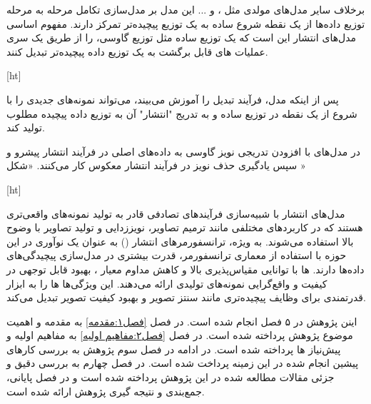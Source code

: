برخلاف سایر مدل‌های مولدی مثل ،  و ... این مدل‌ بر مدل‌سازی تکامل مرحله به مرحله توزیع داده‌ها از یک نقطه شروع ساده به یک توزیع پیچیده‌تر تمرکز دارند. مفهوم اساسی مدل‌های انتشار این است که یک توزیع ساده مثل توزیع گاوسی، را از طریق یک سری عملیات های قابل برگشت به یک توزیع داده پیچیده‌تر تبدیل کنند.

[ht]

پس از اینکه مدل، فرآیند تبدیل را آموزش می‌بیند، می‌تواند نمونه‌های جدیدی را با شروع از یک نقطه در توزیع ساده و به تدریج "انتشار" آن به توزیع داده پیچیده مطلوب تولید کند.

در مدل‌های 
با افزودن تدریجی نویز گاوسی به داده‌های اصلی در فرآیند انتشار پیشرو و سپس یادگیری حذف نویز در فرآیند انتشار معکوس کار می‌کنند. «شکل »


[ht]




مدل‌های انتشار با شبیه‌سازی فرآیندهای تصادفی قادر به تولید نمونه‌های واقعی‌تری هستند که در کاربردهای مختلفی مانند ترمیم تصاویر، نویززدایی و تولید تصاویر با وضوح بالا استفاده می‌شوند. به ویژه، ترانسفورمرهای انتشار () به عنوان یک نوآوری در این حوزه با استفاده از معماری ترانسفورمر، قدرت بیشتری در مدل‌سازی پیچیدگی‌های داده‌ها دارند. ها با توانایی مقیاس‌پذیری بالا و کاهش مداوم معیار ، بهبود قابل توجهی در کیفیت و واقع‌گرایی نمونه‌های تولیدی ارائه می‌دهند. این ویژگی‌ها ها را به ابزار قدرتمندی برای وظایف پیچیده‌تری مانند سنتز تصویر و بهبود کیفیت تصویر تبدیل می‌کند.


اینن پژوهش در ۵ فصل انجام شده است. در فصل \ref{فصل۱:مقدمه} به مقدمه و اهمیت موضوع پژوهش پرداخته شده است. در فصل \ref{فصل۲:مفاهیم اولیه} به مفاهیم اولیه و پیش‌نیاز ها پرداخته شده است. در ادامه در فصل سوم پژوهش به بررسی کار‌های پیشین انجام شده در این زمینه پرداخت شده است. در فصل چهارم به بررسی دقیق و جزئی مقالات مطالعه شده در این پژوهش پرداخته شده است و در فصل پایانی، جمع‌بندی و نتیجه گیری پژوهش ارائه شده است.






























